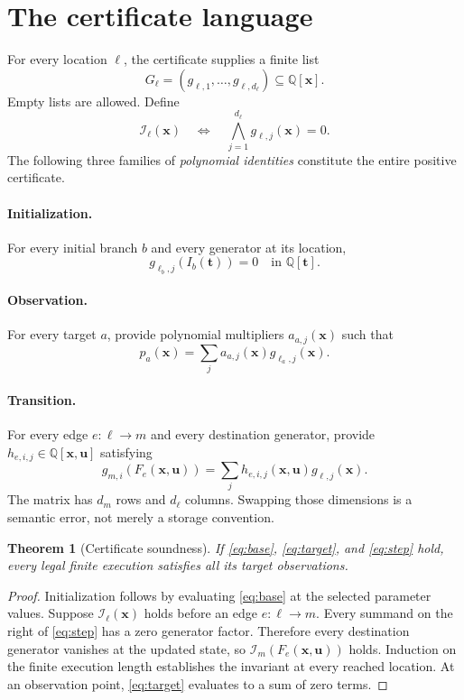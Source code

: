 \documentclass[11pt,letterpaper]{article}
\newtheorem{theorem}{Theorem}[section]
\theoremstyle{definition}
\newcommand{\Q}{\mathbb Q}
\newcommand{\inv}{\mathcal I}
\begin{document}
\section{The certificate language}
\label{sec:certificate}

For every location $\ell$, the certificate supplies a finite list
\[
 G_\ell=(g_{\ell,1},\ldots,g_{\ell,d_\ell})\subseteq\Q[\bm x].
\]
Empty lists are allowed. Define
\[
 \inv_\ell(\bm x)\quad\Longleftrightarrow\quad
 \bigwedge_{j=1}^{d_\ell}g_{\ell,j}(\bm x)=0.
\]
The following three families of \emph{polynomial identities} constitute the
entire positive certificate.

\paragraph{Initialization.}
For every initial branch $b$ and every generator at its location,
\begin{equation}\label{eq:base}
 g_{\ell_b,j}(I_b(\bm t))=0\quad\text{in }\Q[\bm t].
\end{equation}

\paragraph{Observation.}
For every target $a$, provide polynomial multipliers $a_{a,j}(\bm x)$ such that
\begin{equation}\label{eq:target}
 p_a(\bm x)=\sum_j a_{a,j}(\bm x)g_{\ell_a,j}(\bm x).
\end{equation}

\paragraph{Transition.}
For every edge $e:\ell\to m$ and every destination generator, provide
$h_{e,i,j}\in\Q[\bm x,\bm u]$ satisfying
\begin{equation}\label{eq:step}
 g_{m,i}(F_e(\bm x,\bm u))
   =\sum_j h_{e,i,j}(\bm x,\bm u)g_{\ell,j}(\bm x).
\end{equation}
The matrix has $d_m$ rows and $d_\ell$ columns. Swapping those dimensions is a
semantic error, not merely a storage convention.

\begin{theorem}[Certificate soundness]\label{thm:sound}
If \eqref{eq:base}, \eqref{eq:target}, and \eqref{eq:step} hold, every legal
finite execution satisfies all its target observations.
\end{theorem}
\begin{proof}
Initialization follows by evaluating \eqref{eq:base} at the selected parameter
values. Suppose $\inv_\ell(\bm x)$ holds before an edge $e:\ell\to m$. Every
summand on the right of \eqref{eq:step} has a zero generator factor. Therefore
every destination generator vanishes at the updated state, so
$\inv_m(F_e(\bm x,\bm u))$ holds. Induction on the finite execution length
establishes the invariant at every reached location. At an observation point,
\eqref{eq:target} evaluates to a sum of zero terms.
\end{proof}
\end{document}
